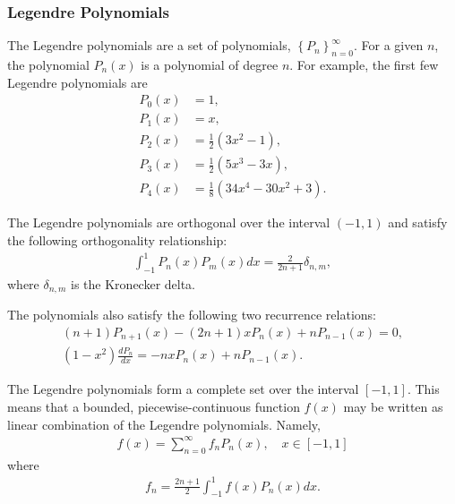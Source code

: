 \documentclass[11pt]{article}
\begin{document}
\subsubsection{Legendre Polynomials}
\label{sec:orgheadline50}
The Legendre polynomials are a set of polynomials, \(\left\{ P_n \right\}_{n=0}^\infty\).  For a given \(n\), the polynomial \(P_n(x)\) is a polynomial of degree \(n\).  For example, the first few Legendre polynomials are
\begin{align*}
  P_0(x) &= 1, \\
  P_1(x) &= x, \\
  P_2(x) &= \frac{1}{2}\left(3 x^2 - 1 \right), \\
  P_3(x) &= \frac{1}{2}\left(5 x^3 - 3 x \right), \\
  P_4(x) &= \frac{1}{8}\left(34 x^4 - 30 x^2 + 3 \right).
\end{align*}

The Legendre polynomials are orthogonal over the interval \((-1, 1)\) and satisfy the following orthogonality relationship:
\begin{align}
  \int_{-1}^1 P_n(x) P_m(x) dx = \frac{2}{2n+1} \delta_{n,m},
\end{align}
where \(\delta_{n,m}\) is the Kronecker delta.

The polynomials also satisfy the following two recurrence relations:
\begin{align}
  (n+1) P_{n+1}(x) - (2n + 1) x P_n(x) + n P_{n-1}(x) = 0, \\
  \left(1 - x^2\right) \frac{dP_n}{dx} = -n x P_n(x) + n P_{n-1}(x).
\end{align}

The Legendre polynomials form a complete set over the interval \([-1, 1]\).  This means that a bounded, piecewise-continuous function \(f(x)\) may be written as linear combination of the Legendre polynomials.  Namely,
\begin{align}
  f(x) = \sum_{n=0}^\infty f_n P_n(x), \quad x \in [-1,1]
\end{align}
where
\begin{align}
  f_n = \frac{2n+1}{2} \int_{-1}^{1} f(x) P_n(x) dx.
\end{align}
\end{document}
